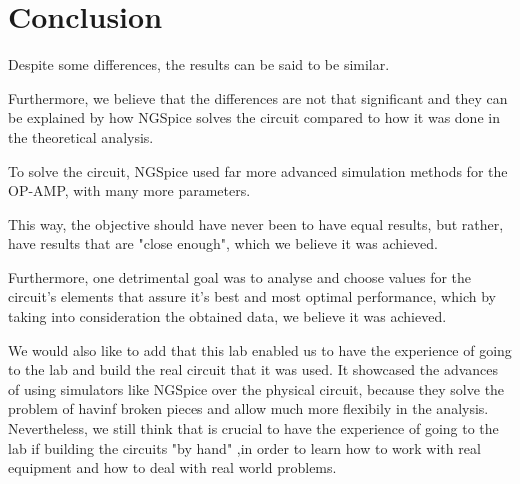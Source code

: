 \section{Conclusion}
\label{sec:conclusion}

\indent

Despite some differences, the results can be said to be similar.

Furthermore, we believe that the differences are not that significant and they can be explained by how NGSpice solves the circuit compared to how it was done in the theoretical analysis.

To solve the circuit, NGSpice used far more advanced simulation methods for the OP-AMP, with many more parameters. 

This way, the objective should have never been to have equal results, but rather, have results that are "close enough", which we believe it was achieved.

Furthermore, one detrimental goal was to analyse and choose values for the circuit's elements that assure it's best and most optimal performance, which by taking into consideration the obtained data, we believe it was achieved.

We would also like to add that this lab enabled us to have the experience of going to the lab and build the real circuit that it was used. It showcased the advances of using simulators like NGSpice over the physical circuit, because they solve the problem of havinf broken pieces and allow much more flexibily in the analysis. Nevertheless, we still think that is crucial to have the experience of going to the lab if building the circuits "by hand" ,in order to learn how to work with real equipment and how to deal with real world problems. 


